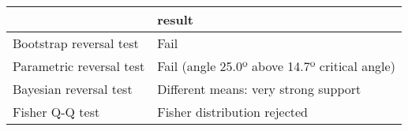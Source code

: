 \begin{tabular}{ll}
\toprule
{} &                                         result \\
\midrule
Bootstrap reversal test  &                                           Fail \\
Parametric reversal test &  Fail (angle 25.0º above 14.7º critical angle) \\
Bayesian reversal test   &           Different means: very strong support \\
Fisher Q-Q test          &                   Fisher distribution rejected \\
\bottomrule
\end{tabular}
